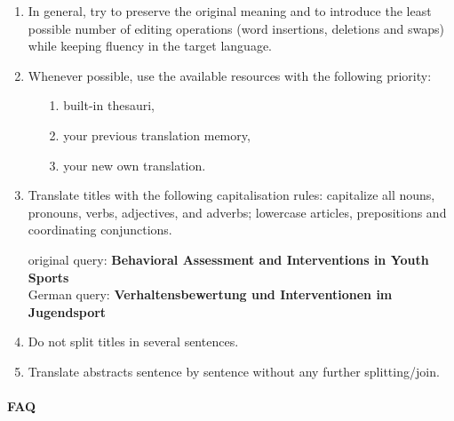 \documentclass[a4paper,10pt]{article}
\newcommand{\ex}[1]{\begin{tcolorbox}[]{#1}\end{tcolorbox}}
\begin{document}
\begin{enumerate}

 \item In general, try to preserve the original meaning and to introduce the least possible number of editing operations (word insertions, deletions and swaps) while keeping fluency in the target language. 
 
 \item Whenever possible, use the available resources with the following priority: 
  \begin{enumerate}
 \item[1.] built-in thesauri, 
 \item[2.] your previous translation memory,
 \item[3.] your new own translation. 
 \end{enumerate}
 \item Translate titles with the following capitalisation rules: capitalize all nouns, pronouns, verbs, adjectives, and adverbs; lowercase articles, prepositions and coordinating conjunctions.
  \ex{original query: {\bf Behavioral Assessment and Interventions in Youth Sports}  \\
     German query: {\bf Verhaltensbewertung und Interventionen im Jugendsport} }

 
 \item Do not split titles in several sentences.
 
 \item Translate abstracts sentence by sentence without any further splitting/join.
  
\end{enumerate}



\paragraph{FAQ}
\end{document}
